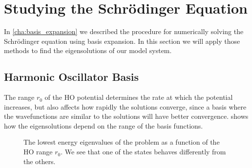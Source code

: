 \documentclass[../main/report.tex]{subfiles}
\begin{document}
\section{Studying the  Schrödinger Equation}
In \cref{cha:basis_expansion} we described the procedure for numerically solving the Schrödinger equation using basis expansion. 
In this section we will apply those methods to find the eigensolutions of our model system. 

\subsection{Harmonic Oscillator Basis}
The range $r_0$ of the HO potential determines the rate at which the potential increases, but also affects how rapidly the solutions converge, since a basis where the wavefunctions are similar to the solutions will have better convergence. 
 shows how the eigensolutions depend on the range of the basis functions.


\begin{figure}[ht!]
  \Ernoll
  \centering
  \caption{The lowest energy eigenvalues of the  problem as a function of the HO range $r_0$. We see that one of the states behaves differently from the others.}
  \label{fig:energies(r0)}
\end{figure}
\end{document}
